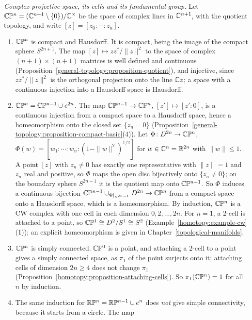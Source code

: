 \begin{example}\label{homotopy:example-projective-cells}
\emph{Complex projective space, its cells and its fundamental group.} Let $\mathbb{C}\mathbb{P}^n = (\mathbb{C}^{n+1} \setminus \{0\})/\mathbb{C}^\times$ be the space of complex lines in
$\mathbb{C}^{n+1}$, with the quotient topology, and write $[z] = [z_0 : \cdots : z_n]$.
\begin{enumerate}
\item $\mathbb{C}\mathbb{P}^n$ is compact and Hausdorff. It is compact, being the image of the compact sphere $S^{2n+1}$. The map $[z] \mapsto zz^*/\|z\|^2$ to the space of
complex $(n + 1) \times (n + 1)$ matrices is well defined and continuous (Proposition~\ref{general-topology:proposition-quotient}), and injective, since
$zz^*/\|z\|^2$ is the orthogonal projection onto the line $\mathbb{C} z$; a space with a continuous injection into a Hausdorff space is Hausdorff.
\item $\mathbb{C}\mathbb{P}^n = \mathbb{C}\mathbb{P}^{n-1} \cup e^{2n}$. The map $\mathbb{C}\mathbb{P}^{n-1} \to \mathbb{C}\mathbb{P}^n$, $[z'] \mapsto [z' : 0]$, is a continuous injection from a compact space to a Hausdorff
space, hence a homeomorphism onto the closed set $\{z_n = 0\}$ (Proposition~\ref{general-topology:proposition-compact-basic}(4)). Let
$\Phi \colon D^{2n} \to \mathbb{C}\mathbb{P}^n$, $\Phi(w) = [w_1 : \cdots : w_n : (1 - \|w\|^2)^{1/2}]$ for $w \in \mathbb{C}^n = \mathbb{R}^{2n}$ with $\|w\| \leq 1$. A point $[z]$ with
$z_n \neq 0$ has exactly one representative with $\|z\| = 1$ and $z_n$ real and positive, so $\Phi$ maps the open disc bijectively onto $\{z_n \neq 0\}$; on the
boundary sphere $S^{2n-1}$ it is the quotient map onto $\mathbb{C}\mathbb{P}^{n-1}$. So $\Phi$ induces a continuous bijection
$\mathbb{C}\mathbb{P}^{n-1} \cup_{\Phi|_{S^{2n-1}}} D^{2n} \to \mathbb{C}\mathbb{P}^n$ from a compact space onto a Hausdorff space, which is a homeomorphism. By induction, $\mathbb{C}\mathbb{P}^n$ is a CW complex
with one cell in each dimension $0, 2, \ldots, 2n$. For $n = 1$, a $2$-cell is attached to a point, so $\mathbb{C}\mathbb{P}^1 \cong D^2/S^1 \cong S^2$ (Example~\ref{homotopy:example-cw}(1));
an explicit homeomorphism is given in Chapter~\ref{topological-manifolds}.
\item $\mathbb{C}\mathbb{P}^n$ is simply connected. $\mathbb{C}\mathbb{P}^0$ is a point, and attaching a $2$-cell to a point gives a simply connected space, as $\pi_1$ of the point surjects onto
it; attaching cells of dimension $2n \geq 4$ does not change $\pi_1$ (Proposition~\ref{homotopy:proposition-attaching-cells}). So $\pi_1(\mathbb{C}\mathbb{P}^n) = 1$ for all
$n$ by induction.
\item The same induction for $\mathbb{R}\mathbb{P}^n = \mathbb{R}\mathbb{P}^{n-1} \cup e^n$ does \emph{not} give simple connectivity, because it starts from a circle. The map

\end{enumerate}
\end{example}
